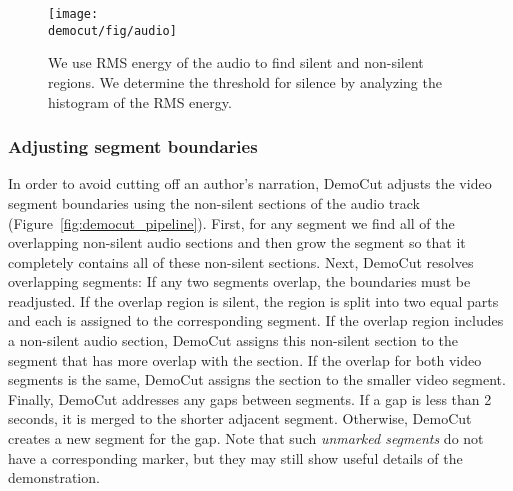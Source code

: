 \begin{figure}[t]
  \centering
\texttt{[image: \\democut/fig/audio]}
  \caption{We use RMS energy of the audio to find silent and non-silent regions. We determine the threshold for silence by analyzing the histogram of the RMS energy.}
  \label{fig:audio}
\end{figure}

\subsubsection{Adjusting segment boundaries}

In order to avoid cutting off an author's narration, DemoCut
adjusts the video segment boundaries using the non-silent sections
of the audio track (Figure~\ref{fig:democut_pipeline}). First, for any segment
we find
all of the overlapping non-silent audio sections and then grow the
segment so that it completely contains all of these non-silent sections.
%
Next, DemoCut resolves overlapping segments: If any two segments
overlap,
the boundaries must be readjusted.
%
If the overlap region is silent, the region is split into two equal parts and each is assigned to the
corresponding segment.
%
If the overlap region includes a non-silent audio section,
DemoCut assigns this non-silent section to the segment that has
more overlap with the section. If the overlap for both video segments is the same, DemoCut assigns the section to the smaller video segment.
%
Finally, DemoCut addresses any gaps between segments. If a gap is less
than 2 seconds, it is merged to the shorter adjacent segment.
Otherwise, DemoCut creates a new segment for the gap. Note
that such {\em unmarked segments} do not have a corresponding marker, but
they may still show useful details of the demonstration.


%

